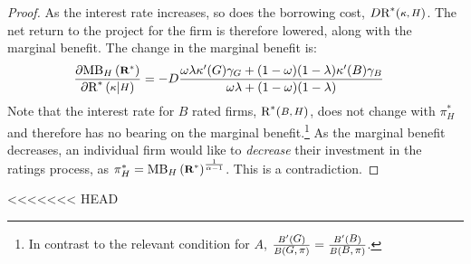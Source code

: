 \documentclass{report}
\begin{document}
\begin{proof}
As the interest rate increases, so does the borrowing cost, $D\textup{R}^{*}(\medmath{\kappa,H})$. The net return to the project for the firm is therefore lowered, along with the marginal benefit. The change in the marginal benefit is:
\begin{align}
\frac{\partial \textup{MB}_{H}\left(\medmath{\mathbf{R^{*}}}\right)}{\partial \textup{R}^{*}\left(\medmath{\kappa}|\medmath{H}\right)} &= -D\frac{\omega\lambda\kappa'(G)\gamma_{G}+(1-\omega)(1-\lambda)\kappa'(B)\gamma_B}{\omega\lambda + (1-\omega)(1-\lambda)}
\end{align}
Note that the interest rate for $B$ rated firms, $\textup{R}^{*}(\medmath{B,H})$, does not change with $\pi^{*}_{H}$ and therefore has no bearing on the marginal benefit.\footnote{In contrast to the relevant condition for $A$, $\frac{B'(\medmath{G})}{B(\medmath{G,\pi})}=\frac{B'(\medmath{B})}{B(\medmath{B,\pi})}$.} As the marginal benefit decreases, an individual firm would like to \emph{decrease} their investment in the ratings process, as $\pi^{*}_{H}=\textup{MB}_{H}\left(\medmath{\mathbf{R^{*}}}\right)^{\frac{1}{\alpha-1}}$. This is a contradiction.
\end{proof}


<<<<<<< HEAD
\end{document}
